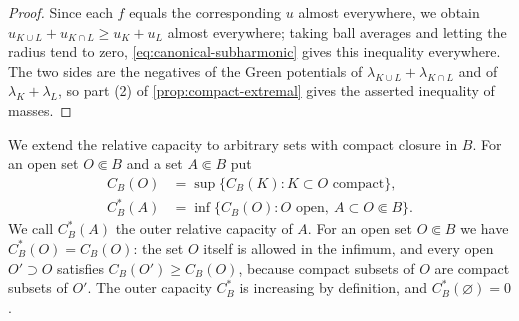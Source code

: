 \begin{proof}
Since each $f$ equals the corresponding $u$ almost everywhere, we obtain $u_{K\cup L}+u_{K\cap L}\geq u_K+u_L$ almost everywhere; taking ball averages and letting the radius tend to zero, \eqref{eq:canonical-subharmonic} gives this inequality everywhere. The two sides are the negatives of the Green potentials of $\lambda_{K\cup L}+\lambda_{K\cap L}$ and of $\lambda_K+\lambda_L$, so part (2) of \cref{prop:compact-extremal} gives the asserted inequality of masses.
\end{proof}

We extend the relative capacity to arbitrary sets with compact closure in $B$. For an open set $O\Subset B$ and a set $A\Subset B$ put
\[
 \begin{aligned}
 C_B(O)&=\sup\{C_B(K):K\subset O\text{ compact}\},\\
 C_B^*(A)&=\inf\{C_B(O):O\text{ open},\ A\subset O\Subset B\}.
 \end{aligned}
\]
We call $C_B^*(A)$ the outer relative capacity of $A$. For an open set $O\Subset B$ we have $C_B^*(O)=C_B(O)$: the set $O$ itself is allowed in the infimum, and every open $O'\supset O$ satisfies $C_B(O')\geq C_B(O)$, because compact subsets of $O$ are compact subsets of $O'$. The outer capacity $C_B^*$ is increasing by definition, and $C_B^*(\varnothing)=0$.

